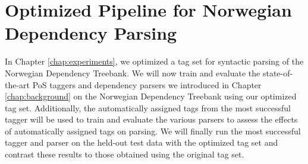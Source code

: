 \documentclass[a4paper,12pt,english]{book}
\begin{document}

\chapter{Optimized Pipeline for Norwegian Dependency Parsing}
\label{chap:optpipeline}
In Chapter \ref{chap:experiments}, we optimized a tag set for syntactic parsing
of the Norwegian Dependency Treebank. We will now train and evaluate the
state-of-the-art PoS taggers and dependency parsers we introduced in Chapter
\ref{chap:background} on the Norwegian Dependency Treebank using our optimized
tag set. Additionally, the automatically assigned tags from the most successful
tagger will be used to train and evaluate the various parsers to assess the
effects of automatically assigned tags on parsing. We will finally run the most
successful tagger and parser on the held-out test data with the optimized tag
set and contrast these results to those obtained using the original tag set.
\end{document}

